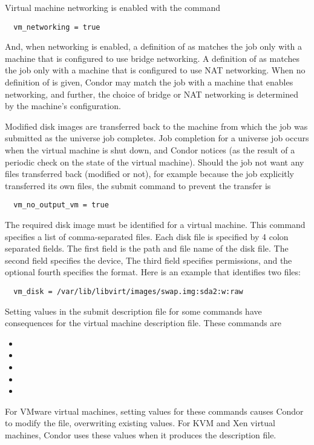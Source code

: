 Virtual machine networking is enabled with the command
\begin{verbatim}
  vm_networking = true
\end{verbatim}
And, when networking is enabled, a definition of
 as 
matches the job only with a machine that is configured to use
bridge networking.
A definition of
 as 
matches the job only with a machine that is configured to use
NAT networking.
When no definition of
 is given,
Condor may
match the job with a machine that enables networking,
and further, the choice of bridge or NAT networking
is determined by the machine's configuration.

Modified disk images are transferred back to the machine from which
the job was submitted as the  universe job completes.
Job completion for a  universe job occurs when 
the virtual machine is shut down, and Condor notices 
(as the result of a periodic check on the state of the virtual machine).
Should the job not want any files transferred back (modified or not),
for example because the job explicitly transferred its own files,
the submit command to prevent the transfer is
\begin{verbatim}
  vm_no_output_vm = true
\end{verbatim}

The required disk image must be identified for a virtual machine.
This  command specifies a list of comma-separated files.
Each disk file is specified by 4 colon separated fields.
The first field is the path and file name of the disk file.
The second field specifies the device,
The third field specifies permissions, and the optional 
fourth specifies the format.
Here is an example that identifies two files:
\footnotesize
\begin{verbatim}
  vm_disk = /var/lib/libvirt/images/swap.img:sda2:w:raw
\end{verbatim}
\normalsize

Setting values in the submit description file for some commands
have consequences for the virtual machine description file.
These commands are
\begin{itemize}
  \item {}
  \item {}
  \item {}
  \item {}
  \item {}
\end{itemize}
For VMware virtual machines,
setting values for these commands causes Condor to modify the
 file, overwriting existing values.
For KVM and Xen virtual machines,
Condor uses these values when it produces the description file.

